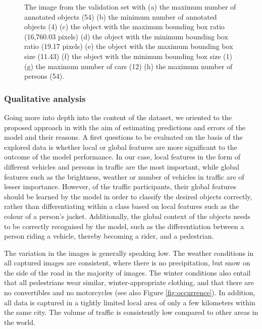 \documentclass{article}
\begin{document}
\begin{figure}[h!]
    \vspace{-0.1cm}
    \vspace{-0.49cm}
    \caption{The image from the validation set with (a) the maximum number of annotated objects (54) (b) the minimum number of annotated objects (4) (c) the object with the maximum bounding box ratio (16,760.03 pixels) (d) the object with the minimum bounding box ratio (19.17 pixels) (e) the object with the maximum bounding box size (11.43) (f) the object with the minimum bounding box size (1) (g) the maximum number of cars (12) (h) the maximum number of persons (54).}
    \label{fig:extreme_val}
\end{figure}
\newpage

\subsubsection*{Qualitative analysis}

Going more into depth into the content of the dataset, we oriented to the proposed approach in \cite{Karpathy2019} with the aim of estimating predictions and errors of the model and their reasons. A first questions to be evaluated on the basis of the explored data is whether local or global features are more significant to the outcome of the model performance. In our case, local features in the form of different vehicles and persons in traffic are the most important, while global features such as the brightness, weather or number of vehicles in traffic are of lesser importance. However, of the traffic participants, their global features should be learned by the model in order to classify the desired objects correctly, rather than differentiating within a class based on local features such as the colour of a person's jacket. Additionally, the global context of the objects needs to be correctly recognised by the model, such as the differentiation between a person riding a vehicle, thereby becoming a rider, and a pedestrian.

The variation in the images is generally speaking low. The weather conditions in all captured images are consistent, where there is no precipitation, but snow on the side of the road in the majority of images. The winter conditions also entail that all pedestrians wear similar, winter-appropriate clothing, and that there are no convertibles and no motorcycles (see also Figure \ref{fig:occurrence}). In addition, all data is captured in a tightly limited local area of only a few kilometers within the same city. The volume of traffic is consistently low compared to other areas in the world.
\end{document}

